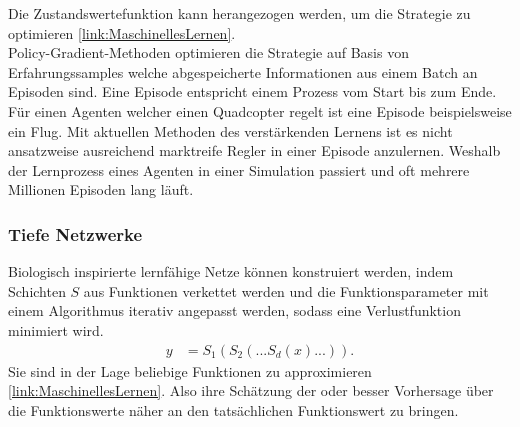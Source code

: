 Die Zustandswertefunktion kann herangezogen werden, um die Strategie zu optimieren \ref{link:MaschinellesLernen}.\\
Policy-Gradient-Methoden optimieren die Strategie auf Basis von Erfahrungssamples welche abgespeicherte Informationen aus einem Batch an Episoden sind. Eine Episode entspricht einem Prozess vom Start bis zum Ende. Für einen Agenten welcher einen Quadcopter regelt ist eine Episode beispielsweise ein Flug. Mit aktuellen Methoden des verstärkenden Lernens ist es nicht ansatzweise ausreichend marktreife Regler in einer Episode anzulernen. Weshalb der Lernprozess eines Agenten in einer Simulation passiert und oft mehrere Millionen Episoden lang läuft.

\subsubsection{Tiefe Netzwerke}
Biologisch inspirierte lernfähige Netze können konstruiert werden, indem Schichten $S$ aus Funktionen verkettet werden und die Funktionsparameter mit einem Algorithmus iterativ angepasst werden, sodass eine Verlustfunktion minimiert wird.
\begin{align}
  y &= S_1(S_2(...S_d(x)...)).
\end{align}
Sie sind in der Lage beliebige Funktionen zu approximieren \ref{link:MaschinellesLernen}. Also ihre Schätzung der oder besser Vorhersage über die Funktionswerte näher an den tatsächlichen Funktionswert zu bringen.
